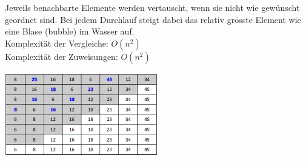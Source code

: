 Jeweils benachbarte Elemente werden vertauscht, wenn sie nicht wie gewünscht geordnet sind. Bei jedem Durchlauf steigt dabei das relativ grösste Element wie eine Blase (bubble) im Wasser auf.\\
Komplexität der Vergleiche: $O(n^2)$\\
Komplexität der Zuweisungen: $O(n^2)$\\
\begin{multicols}{2}

\includegraphics[width=0.5\textwidth]{images/Algorithmen/Bubblesort.png}
\end{multicols}
\ \newpage

